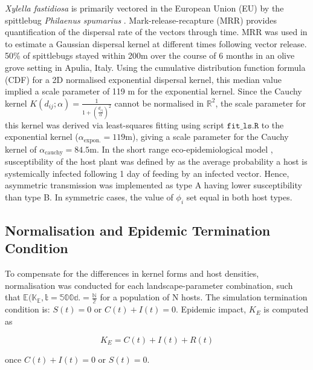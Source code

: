 \documentclass[11pt,letterpaper]{article}
\begin{document}
\emph{Xylella fastidiosa} is primarily vectored in the European Union (EU) by the spittlebug \emph{Philaenus spumarius} \cite{Bragard2019}\cite{Bodino2021}. Mark-release-recapture (MRR) provides quantification of the dispersal rate of the vectors through time. MRR was used in \cite{Bodino2021} to estimate a Gaussian dispersal kernel at different times following vector release. 50\% of spittlebugs stayed within 200m over the course of 6 months in an olive grove setting in Apulia, Italy. Using the cumulative distribution function formula (CDF) for a 2D normalised exponential dispersal kernel, this median value implied a scale parameter of 119 m for the exponential kernel. Since the Cauchy kernel $K(d_{ij}; \alpha) = \frac{1}{1+\left(\frac{d_{ij}} {\alpha}\right)^2}$ cannot be normalised in $\mathbb{R}^2$, the scale parameter for this kernel was derived via least-squares fitting using script $\texttt{fit\_ls.R}$ to the exponential kernel ($\alpha_{\mathrm{expon.}}=119$m), giving a scale parameter for the Cauchy kernel of $\alpha_{\mathrm{cauchy}}= 84.5$m.
In the short range eco-epidemiological model \cite{Bragard2019}, susceptibility of the host plant was defined by as the average probability a host is systemically infected following 1 day of feeding by an infected vector. Hence, asymmetric transmission was implemented as type A having lower susceptibility than type B. In symmetric cases, the value of $\phi_{i}$ set equal in both host types. 
\FloatBarrier
\subsection*{Normalisation and Epidemic Termination Condition}

To compensate for the differences in kernel forms and host densities, normalisation was conducted for each landscape-parameter combination, such that $\mathbb{E(K_E, t = 500 d. = \frac{N}{2}}$ for a population of N hosts.
The simulation termination condition is: $S(t) = 0$ or $C(t) + I(t) = 0$. Epidemic impact, $K_{E}$ is computed as 

\begin{equation}
    K_{E} = C(t) + I(t) + R(t)
\end{equation}

once $C(t) + I(t) = 0 $ or $ S(t) = 0$. 
\end{document}
